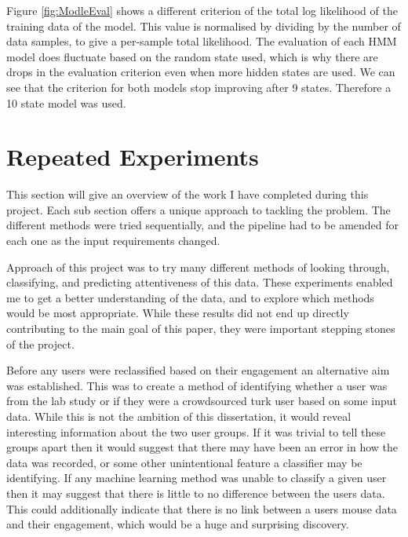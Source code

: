 \documentclass{article}
\begin{document}
Figure \ref{fig:ModleEval} shows a different criterion of the total log likelihood of the training data of the model.
This value is normalised by dividing by the number of data samples, to give a per-sample total likelihood.
The evaluation of each HMM model does fluctuate based on the random state used, which is why there are drops in the evaluation criterion even when more hidden states are used.
We can see that the criterion for both models stop improving after 9 states.
Therefore a 10 state model was used.


\section{Repeated Experiments}


This section will give an overview of the work I have completed during this project.
Each sub section offers a unique approach to tackling the problem.
The different methods were tried sequentially, and the pipeline had to be amended for each one as the input requirements changed.

Approach of this project was to try many different methods of looking through, classifying, and predicting attentiveness of this data.
These experiments enabled me to get a better understanding of the data, and to explore which methods would be most appropriate.
While these results did not end up directly contributing to the main goal of this paper, they were important stepping stones of the project.

Before any users were reclassified based on their engagement an alternative aim was established.
This was to create a method of identifying whether a user was from the lab study or if they were a crowdsourced turk user based on some input data.
While this is not the ambition of this dissertation, it would reveal interesting information about the two user groups.
If it was trivial to tell these groups apart then it would suggest that there may have been an error in how the data was recorded, or some other unintentional feature a classifier may be identifying.
If any machine learning method was unable to classify a given user then it may suggest that there is little to no difference between the users data.
This could additionally indicate that there is no link between a users mouse data and their engagement, which would be a huge and surprising discovery. 
\end{document}
